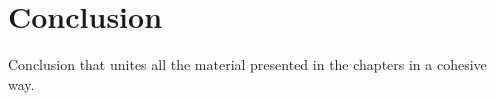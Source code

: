 \chapter{Conclusion}
\label{chap:conclusion}

Conclusion that unites all the material presented in the chapters in a cohesive way.
